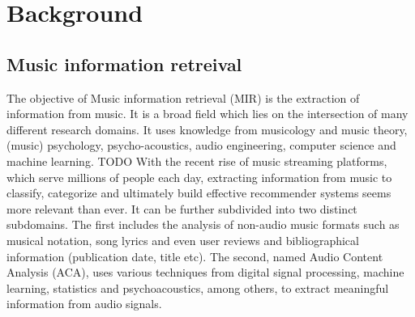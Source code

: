 \documentclass[11pt]{article}
\begin{document}
\section{Background}
\label{sec:org4d1b31d}
\subsection{Music information retreival}
\label{sec:orge32af72}

The objective of Music information retrieval (MIR) is the extraction of information from music. It is a broad field which lies on the intersection of many different research domains. It uses knowledge from musicology and music theory, (music) psychology, psycho-acoustics, audio engineering, computer science and machine learning. TODO With the recent rise of music streaming platforms, which serve millions of people each day, extracting information from music to classify, categorize and ultimately build effective recommender systems seems more relevant than ever.
It can be further subdivided into two distinct subdomains. The first includes the analysis of non-audio music formats such as musical notation, song lyrics and even user reviews and bibliographical information (publication date, title etc). The second, named Audio Content Analysis (ACA), uses various techniques from digital signal processing, machine learning, statistics and psychoacoustics, among others, to extract meaningful information from audio signals.

\end{document}
